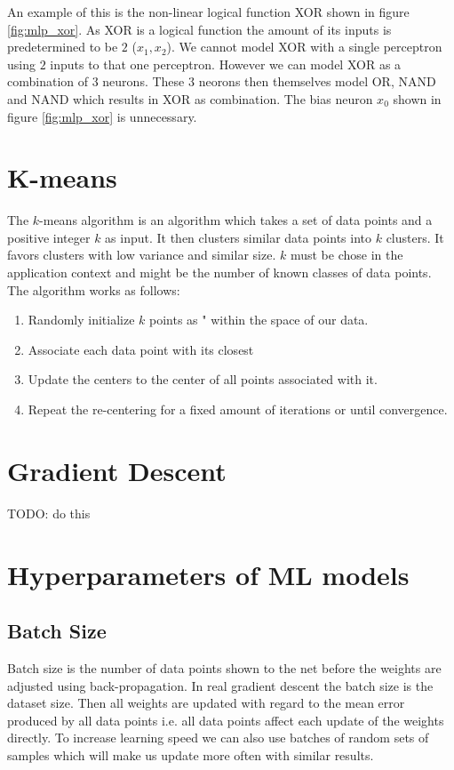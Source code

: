 An example of this is the non-linear logical function XOR shown in figure \ref{fig:mlp_xor}. As XOR is a logical function the amount of its inputs is predetermined to be $2$ ($x_{1}, x_{2}$). We cannot model XOR with a single perceptron using $2$ inputs to that one perceptron. However we can model XOR as a combination of 3 neurons. These 3 neorons then themselves model OR, NAND and NAND which results in XOR as combination. The bias neuron $x_{0}$ shown in figure \ref{fig:mlp_xor} is unnecessary.

\section{K-means}

The $k$-means algorithm is an algorithm which takes a set of data points and a positive integer $k$ as input. It then clusters similar data points into $k$ clusters. It favors clusters with low variance and similar size. $k$ must be chose in the application context and might be the number of known classes of data points.\\

The algorithm works as follows:
\begin{enumerate}
    \item Randomly initialize $k$ points as " within the space of our data.
    \item Associate each data point with its closest 
    \item Update the centers to the center of all points associated with it.
    \item Repeat the re-centering for a fixed amount of iterations or until convergence.
\end{enumerate}

\section{Gradient Descent}

TODO: do this

\section{Hyperparameters of ML models}

\subsection{Batch Size}

Batch size is the number of data points shown to the net before the weights are adjusted using back-propagation. In real gradient descent the batch size is the dataset size. Then all weights are updated with regard to the mean error produced by all data points i.e. all data points affect each update of the weights directly. To increase learning speed we can also use batches of random sets of samples which will make us update more often with similar results.


